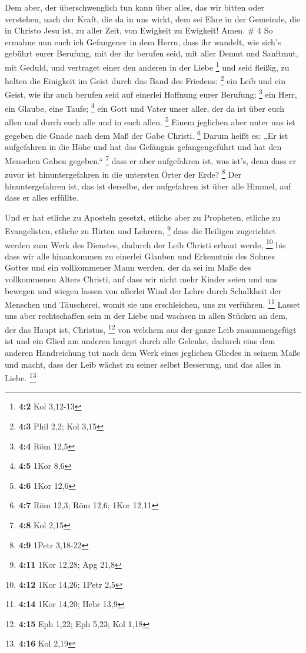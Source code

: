  Dem aber, der überschwenglich tun kann über alles, das
wir bitten oder verstehen, nach der Kraft, die da in uns wirkt,
 dem sei Ehre in der Gemeinde, die in Christo Jesu ist,
zu aller Zeit, von Ewigkeit zu Ewigkeit! Amen. \# 4  So
ermahne nun euch ich Gefangener in dem Herrn, dass ihr wandelt, wie
sich's gebührt eurer Berufung, mit der ihr berufen seid, 
mit aller Demut und Sanftmut, mit Geduld, und vertraget einer den
anderen in der Liebe \footnote{\textbf{4:2} Kol 3,12-13} 
und seid fleißig, zu halten die Einigkeit im Geist durch das Band des
Friedens: \footnote{\textbf{4:3} Phil 2,2; Kol 3,15}  ein
Leib und ein Geist, wie ihr auch berufen seid auf einerlei Hoffnung
eurer Berufung; \footnote{\textbf{4:4} Röm 12,5}  ein
Herr, ein Glaube, eine Taufe; \footnote{\textbf{4:5} 1Kor 8,6}
 ein Gott und Vater unser aller, der da ist über euch
allen und durch euch alle und in euch allen. \footnote{\textbf{4:6} 1Kor
  12,6}  Einem jeglichen aber unter uns ist gegeben die
Gnade nach dem Maß der Gabe Christi. \footnote{\textbf{4:7} Röm 12,3;
  Röm 12,6; 1Kor 12,11}  Darum heißt es: „Er ist
aufgefahren in die Höhe und hat das Gefängnis gefangengeführt und hat
den Menschen Gaben gegeben.`` \footnote{\textbf{4:8} Kol 2,15}
 dass er aber aufgefahren ist, was ist's, denn dass er
zuvor ist hinuntergefahren in die untersten Örter der Erde? \footnote{\textbf{4:9}
  1Petr 3,18-22}  Der hinuntergefahren ist, das ist
derselbe, der aufgefahren ist über alle Himmel, auf dass er alles
erfüllte.

 Und er hat etliche zu Aposteln gesetzt, etliche aber zu
Propheten, etliche zu Evangelisten, etliche zu Hirten und Lehrern,
\footnote{\textbf{4:11} 1Kor 12,28; Apg 21,8}  dass die
Heiligen zugerichtet werden zum Werk des Dienstes, dadurch der Leib
Christi erbaut werde, \footnote{\textbf{4:12} 1Kor 14,26; 1Petr 2,5}
 bis dass wir alle hinankommen zu einerlei Glauben und
Erkenntnis des Sohnes Gottes und ein vollkommener Mann werden, der da
sei im Maße des vollkommenen Alters Christi,  auf dass
wir nicht mehr Kinder seien und uns bewegen und wiegen lassen von
allerlei Wind der Lehre durch Schalkheit der Menschen und Täuscherei,
womit sie uns erschleichen, uns zu verführen. \footnote{\textbf{4:14}
  1Kor 14,20; Hebr 13,9}  Lasset uns aber rechtschaffen
sein in der Liebe und wachsen in allen Stücken an dem, der das Haupt
ist, Christus, \footnote{\textbf{4:15} Eph 1,22; Eph 5,23; Kol 1,18}
 von welchem aus der ganze Leib zusammengefügt ist und
ein Glied am anderen hanget durch alle Gelenke, dadurch eins dem anderen
Handreichung tut nach dem Werk eines jeglichen Gliedes in seinem Maße
und macht, dass der Leib wächst zu seiner selbst Besserung, und das
alles in Liebe. \footnote{\textbf{4:16} Kol 2,19}


